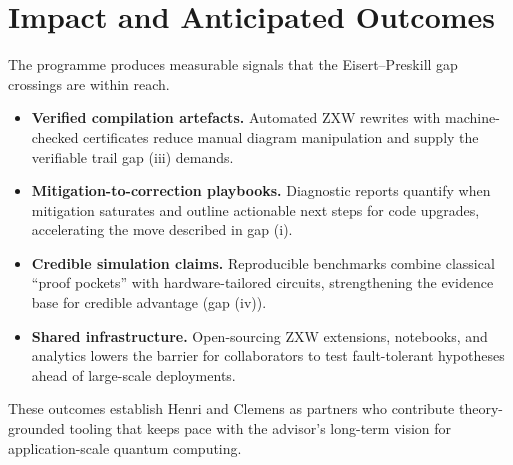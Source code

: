\section{Impact and Anticipated Outcomes}
The programme produces measurable signals that the Eisert--Preskill gap crossings are within reach.
\begin{itemize}
  \item \textbf{Verified compilation artefacts.} Automated ZXW rewrites with machine-checked certificates reduce manual diagram manipulation and supply the verifiable trail gap (iii) demands.
  \item \textbf{Mitigation-to-correction playbooks.} Diagnostic reports quantify when mitigation saturates and outline actionable next steps for code upgrades, accelerating the move described in gap (i).
  \item \textbf{Credible simulation claims.} Reproducible benchmarks combine classical ``proof pockets'' with hardware-tailored circuits, strengthening the evidence base for credible advantage (gap (iv)).
  \item \textbf{Shared infrastructure.} Open-sourcing ZXW extensions, notebooks, and analytics lowers the barrier for collaborators to test fault-tolerant hypotheses ahead of large-scale deployments.
\end{itemize}

These outcomes establish Henri and Clemens as partners who contribute theory-grounded tooling that keeps pace with the advisor's long-term vision for application-scale quantum computing.
